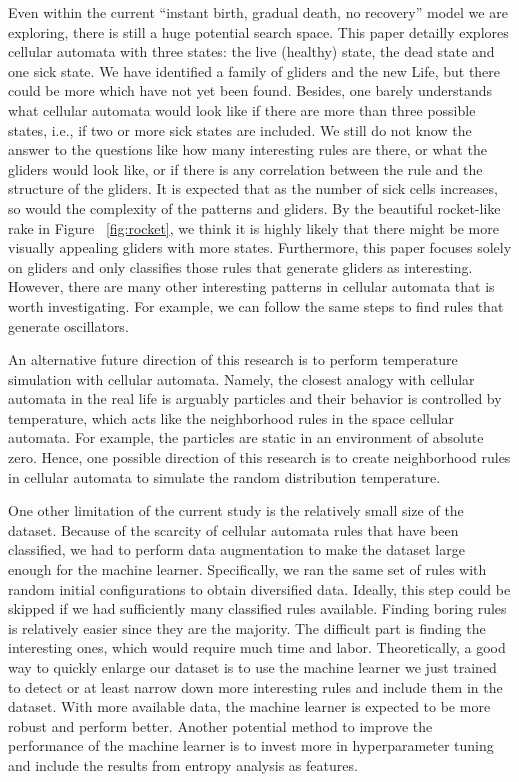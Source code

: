 \documentclass[12pt]{article}
\numberwithin{figure}{section} %
\begin{document}
Even within the current “instant birth, gradual death, no recovery” model we are exploring, there is still a huge potential search space. This paper detailly explores cellular automata with three states: the live (healthy) state, the dead state and one sick state. We have identified a family of gliders and the new Life, but there could be more which have not yet been found. Besides, one barely understands what cellular automata would look like if there are more than three possible states, i.e., if two or more sick states are included. We still do not know the answer to the questions like how many interesting rules are there, or what the gliders would look like, or if there is any correlation between the rule and the structure of the gliders. It is expected that as the number of sick cells increases, so would the complexity of the patterns and gliders. By the beautiful rocket-like rake in Figure ~\ref{fig:rocket}, we think it is highly likely that there might be more visually appealing gliders with more states. Furthermore, this paper focuses solely on gliders and only classifies those rules that generate gliders as interesting. However, there are many other interesting patterns in cellular automata that is worth investigating. For example, we can follow the same steps to find rules that generate oscillators. 

An alternative future direction of this research is to perform temperature simulation with cellular automata. Namely, the closest analogy with cellular automata in the real life is arguably particles and their behavior is controlled by temperature, which acts like the neighborhood rules in the space cellular automata. For example, the particles are static in an environment of absolute zero. Hence, one possible direction of this research is to create neighborhood rules in cellular automata to simulate the random distribution temperature. 

One other limitation of the current study is the relatively small size of the dataset. Because of the scarcity of cellular automata rules that have been classified, we had to perform data augmentation to make the dataset large enough for the machine learner. Specifically, we ran the same set of rules with random initial configurations to obtain diversified data. Ideally, this step could be skipped if we had sufficiently many classified rules available. Finding boring rules is relatively easier since they are the majority. The difficult part is finding the interesting ones, which would require much time and labor. Theoretically, a good way to quickly enlarge our dataset is to use the machine learner we just trained to detect or at least narrow down more interesting rules and include them in the dataset. With more available data, the machine learner is expected to be more robust and perform better. Another potential method to improve the performance of the machine learner is to invest more in hyperparameter tuning and include the results from entropy analysis as features. 
\end{document}
